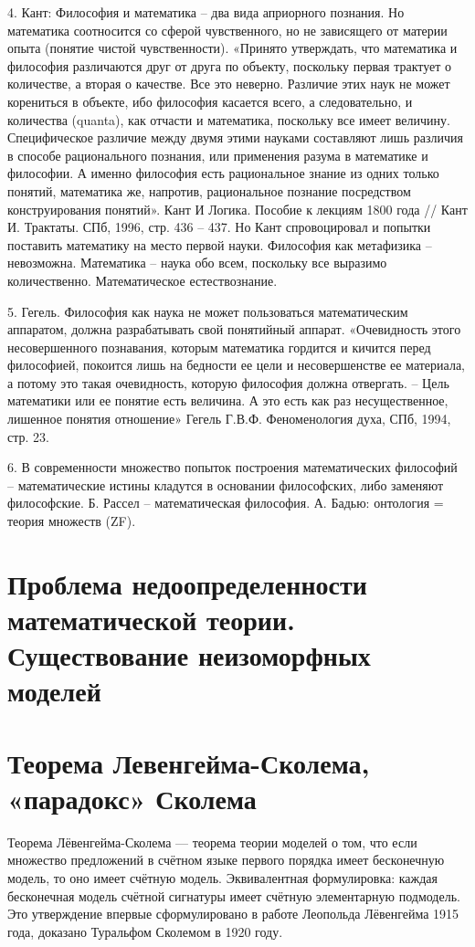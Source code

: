 \documentclass[12pt, specialist, subf, substylefile = spbu.rtx]{disser}
\begin{document}
4. Кант: Философия и математика – два вида априорного познания. Но математика соотносится со сферой чувственного, но не зависящего от материи опыта (понятие чистой чувственности).
«Принято утверждать, что математика и философия различаются друг от друга по объекту, поскольку первая трактует о количестве, а вторая о качестве. Все это неверно. Различие этих наук не может корениться в объекте, ибо философия касается всего, а следовательно, и количества (quanta), как отчасти и математика, поскольку все имеет величину. Специфическое различие между двумя этими науками составляют лишь различия в способе рационального познания, или применения разума в математике и философии. А именно философия есть рациональное знание из одних только понятий, математика же, напротив, рациональное познание посредством конструирования понятий». Кант И Логика. Пособие к лекциям 1800 года // Кант И. Трактаты. СПб, 1996, стр. 436 – 437.
Но Кант спровоцировал и попытки поставить математику на место первой науки. Философия как метафизика – невозможна. Математика – наука обо всем, поскольку все выразимо количественно. Математическое естествознание.

5. Гегель. Философия как наука не может пользоваться математическим аппаратом, должна разрабатывать свой понятийный аппарат.
«Очевидность этого несовершенного познавания, которым математика гордится и кичится перед философией, покоится лишь на бедности ее цели и несовершенстве ее материала, а потому это такая очевидность, которую философия должна отвергать. – Цель математики или ее понятие есть величина. А это есть как раз несущественное, лишенное понятия отношение» Гегель Г.В.Ф. Феноменология духа, СПб, 1994, стр. 23.

6. В современности множество попыток построения математических философий – математические истины кладутся в основании философских, либо заменяют философские. Б. Рассел – математическая философия. А. Бадью: онтология = теория множеств (ZF).

\section{Проблема недоопределенности математической теории. Существование неизоморфных моделей}
\section{Теорема Левенгейма-Сколема, «парадокс» Сколема}
Теорема Лёвенгейма-Сколема — теорема теории моделей о том, что если множество предложений в счётном языке первого порядка имеет бесконечную модель, то оно имеет счётную модель. Эквивалентная формулировка: каждая бесконечная модель счётной сигнатуры имеет счётную элементарную подмодель.
Это утверждение впервые сформулировано в работе Леопольда Лёвенгейма 1915 года, доказано Туральфом Сколемом в 1920 году.
\end{document}
